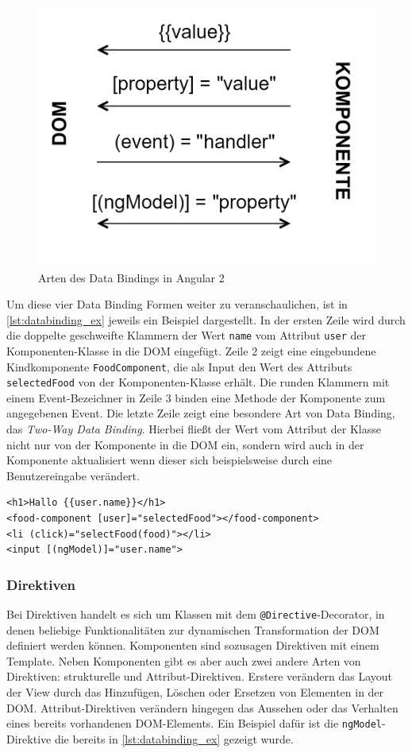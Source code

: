 \begin{figure}[ht!]
	\centering
	\includegraphics[width=0.4\linewidth]{bilder/kap5/databinding}
	\caption[Arten des Data Bindings in Angular 2]{Arten des Data Bindings in Angular 2}
	\label{fig:databinding}
\end{figure}

Um diese vier Data Binding Formen weiter zu veranschaulichen, ist in \cref{lst:databinding_ex} jeweils ein Beispiel dargestellt. In der ersten Zeile wird durch die doppelte geschweifte Klammern der Wert \texttt{name} vom Attribut \texttt{user} der Komponenten-Klasse in die \acs{DOM} eingefügt.
Zeile 2 zeigt eine eingebundene Kindkomponente \texttt{FoodComponent}, die als Input den Wert des Attributs \texttt{selectedFood} von der Komponenten-Klasse erhält.
Die runden Klammern mit einem Event-Bezeichner in Zeile 3 binden eine Methode der Komponente zum angegebenen Event.
Die letzte Zeile zeigt eine besondere Art von Data Binding, das \textit{Two-Way Data Binding}.
Hierbei fließt der Wert vom Attribut der Klasse nicht nur von der Komponente in die \acs{DOM} ein, sondern wird auch in der Komponente aktualisiert wenn dieser sich beispielsweise durch eine Benutzereingabe verändert.
\\
\begin{lstlisting}[language=HTML5,caption={Beispiele zu den Data Binding Arten},label=lst:databinding_ex]
<h1>Hallo {{user.name}}</h1>
<food-component [user]="selectedFood"></food-component>
<li (click)="selectFood(food)"></li>
<input [(ngModel)]="user.name">
\end{lstlisting}

\subsubsection{Direktiven}
Bei Direktiven handelt es sich um Klassen mit dem \texttt{@Directive}-Decorator, in denen beliebige Funktionalitäten zur dynamischen Transformation der DOM definiert werden können.
Komponenten sind sozusagen Direktiven mit einem Template. Neben Komponenten gibt es aber auch zwei andere Arten von Direktiven: strukturelle und Attribut-Direktiven.
Erstere verändern das Layout der View durch das Hinzufügen, Löschen oder Ersetzen von Elementen in der \acs{DOM}.
Attribut-Direktiven verändern hingegen das Aussehen oder das Verhalten eines bereits vorhandenen DOM-Elements.
Ein Beispiel dafür ist die \texttt{ngModel}-Direktive die bereits in \cref{lst:databinding_ex} gezeigt wurde.

